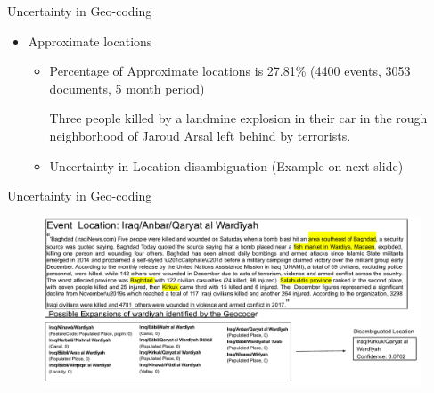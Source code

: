 \begin{frame}{Uncertainty in Geo-coding}
\begin{itemize}
    \item Approximate locations
    \begin{itemize}
        \item Percentage of Approximate locations is 27.81\% (4400 events, 3053 documents, 5 month period)
        \begin{block}{}
         Three people killed by a landmine explosion in their car in the \alert{rough neighborhood of Jaroud Arsal} left behind by terrorists.
        \end{block}
        \item Uncertainty in Location disambiguation (Example on next slide)
    \end{itemize}
\end{itemize}
\end{frame}

\begin{frame}{Uncertainty in Geo-coding}
\begin{figure}
    \centering
    \includegraphics[width=1\textwidth]{Problem2/figures/Geo_uncertainty.pdf}
    \label{fig:my_label}
\end{figure}
\end{frame}

